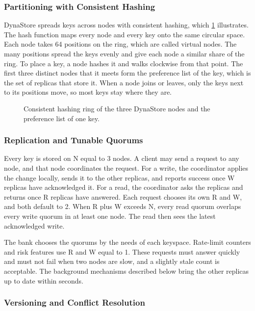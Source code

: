 \documentclass[11pt,a4paper]{article}
\begin{document}
\subsubsection{Partitioning with Consistent Hashing}

DynaStore spreads keys across nodes with consistent hashing, which \cref{fig:dynastore-ring} illustrates. The hash function maps every node and every key onto the same circular space. Each node takes 64 positions on the ring, which are called virtual nodes. The many positions spread the keys evenly and give each node a similar share of the ring. To place a key, a node hashes it and walks clockwise from that point. The first three distinct nodes that it meets form the preference list of the key, which is the set of replicas that store it. When a node joins or leaves, only the keys next to its positions move, so most keys stay where they are.

\begin{figure}[H]\centering

\caption{Consistent hashing ring of the three DynaStore nodes and the preference list of one key.}\label{fig:dynastore-ring}
\end{figure}

\subsubsection{Replication and Tunable Quorums}

Every key is stored on N equal to 3 nodes. A client may send a request to any node, and that node coordinates the request. For a write, the coordinator applies the change locally, sends it to the other replicas, and reports success once W replicas have acknowledged it. For a read, the coordinator asks the replicas and returns once R replicas have answered. Each request chooses its own R and W, and both default to 2. When R plus W exceeds N, every read quorum overlaps every write quorum in at least one node. The read then sees the latest acknowledged write.

The bank chooses the quorums by the needs of each keyspace. Rate-limit counters and risk features use R and W equal to 1. These requests must answer quickly and must not fail when two nodes are slow, and a slightly stale count is acceptable. The background mechanisms described below bring the other replicas up to date within seconds.

\subsubsection{Versioning and Conflict Resolution}
\end{document}
